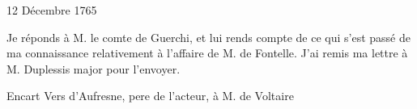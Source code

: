                      \begin{diary}{12 Décembre 1765}{}
                        
                         Je réponds à M. le comte de
                              Guerchi, et lui
                           rends compte de ce qui s'est passé de ma
                           connaissance relativement à l'affaire de M.
                              de Fontelle. J'ai remis ma lettre à M. Duplessis
                           major pour l'envoyer. \bigskip
        
        
                     \end{diary}
                     
                     
                     \begin{diary}{Encart}{} Vers d'Aufresne, pere de
                              l'acteur,
                              à M. de Voltaire
                           \bigskip
        

\end{diary}
